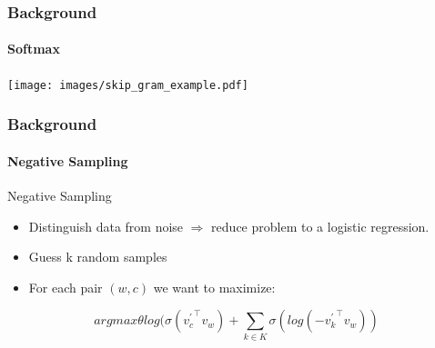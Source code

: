 \fi
\begin{frame}\frametitle{Background}\framesubtitle{Softmax}
\centerline{
\texttt{[image: images/skip\_gram\_example.pdf]}}
\end{frame}
\begin{frame}\frametitle{Background}\framesubtitle{Negative Sampling}
\begin{large}
Negative Sampling
\end{large}
\begin{itemize}
\item Distinguish data from noise $\Rightarrow$ reduce problem to a logistic regression. 
\item Guess k random samples 
\item For each pair $(w,c)$ we want to maximize:
\medskip
\end{itemize}
  \begin{equation}
 arg max \theta  log(\sigma({v^{'}_c}^\intercal v_w ) + \sum_{k\in K} \sigma(log(-{v^{'}_k}^\intercal  v_w ))  
  \end{equation}
\end{frame}